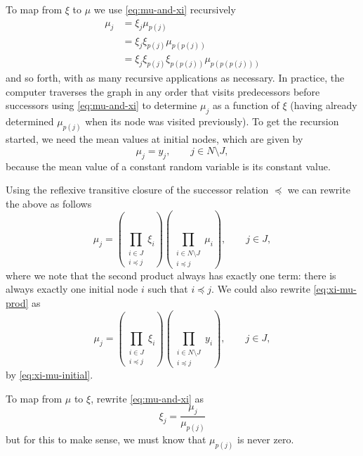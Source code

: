 To map from $\xi$ to $\mu$ we use \eqref{eq:mu-and-xi} recursively
\begin{align*}
   \mu_j
   & =
   \xi_j \mu_{p(j)}
   \\
   & =
   \xi_j \xi_{p(j)} \mu_{p(p(j))}
   \\
   & =
   \xi_j \xi_{p(j)} \xi_{p(p(j))} \mu_{p(p(p(j)))}
\end{align*}
and so forth, with as many recursive applications as necessary.  In practice,
the computer traverses the graph in any order that visits predecessors before
successors using \eqref{eq:mu-and-xi} to determine $\mu_j$ as a function of
$\xi$ (having already determined $\mu_{p(j)}$ when its node was visited
previously).  To get the recursion started, we need the mean values at initial
nodes, which are given by
\begin{equation} \label{eq:xi-mu-initial}
   \mu_j = y_j, \qquad j \in N \setminus J,
\end{equation}
because the mean value of a constant random variable is its constant value.

Using the reflexive transitive closure of the successor relation $\preceq$
we can rewrite the above as follows
\begin{equation} \label{eq:xi-mu-prod}
    \mu_j
    =
    \left( \prod_{\substack{i \in J \\ i \preceq j}} \xi_i \right)
    \left( \prod_{\substack{i \in N \setminus J \\ i \preceq j}} \mu_i \right),
    \qquad j \in J,
\end{equation}
where we note that the second product always has exactly one term: there
is always exactly one initial node $i$ such that $i \preceq j$.
We could also rewrite \eqref{eq:xi-mu-prod} as
\begin{equation} \label{eq:xi-mu-prod-too}
    \mu_j
    =
    \left( \prod_{\substack{i \in J \\ i \preceq j}} \xi_i \right)
    \left( \prod_{\substack{i \in N \setminus J \\ i \preceq j}} y_i \right),
    \qquad j \in J,
\end{equation}
by \eqref{eq:xi-mu-initial}.

To map from $\mu$ to $\xi$, rewrite \eqref{eq:mu-and-xi} as
\begin{equation} \label{eq:mu-to-xi}
   \xi_j = \frac{\mu_j}{\mu_{p(j)}}
\end{equation}
but for this to make sense, we must know that $\mu_{p(j)}$ is never zero.


